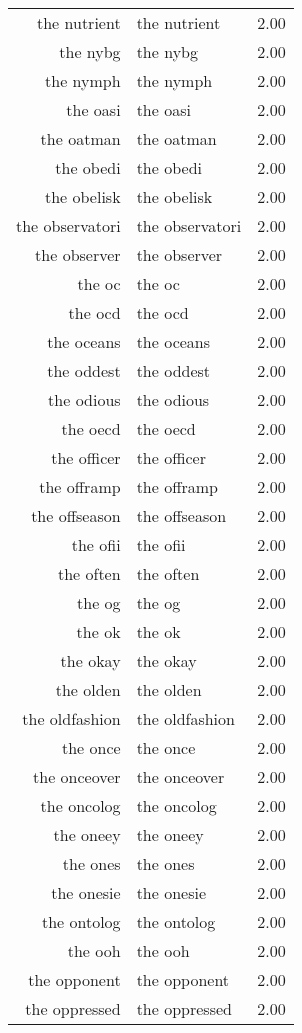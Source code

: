 \begin{table}[ht]
\begin{tabular}{rlr}
  the nutrient & the nutrient & 2.00 \\ 
  the nybg & the nybg & 2.00 \\ 
  the nymph & the nymph & 2.00 \\ 
  the oasi & the oasi & 2.00 \\ 
  the oatman & the oatman & 2.00 \\ 
  the obedi & the obedi & 2.00 \\ 
  the obelisk & the obelisk & 2.00 \\ 
  the observatori & the observatori & 2.00 \\ 
  the observer & the observer & 2.00 \\ 
  the oc & the oc & 2.00 \\ 
  the ocd & the ocd & 2.00 \\ 
  the oceans & the oceans & 2.00 \\ 
  the oddest & the oddest & 2.00 \\ 
  the odious & the odious & 2.00 \\ 
  the oecd & the oecd & 2.00 \\ 
  the officer & the officer & 2.00 \\ 
  the offramp & the offramp & 2.00 \\ 
  the offseason & the offseason & 2.00 \\ 
  the ofii & the ofii & 2.00 \\ 
  the often & the often & 2.00 \\ 
  the og & the og & 2.00 \\ 
  the ok & the ok & 2.00 \\ 
  the okay & the okay & 2.00 \\ 
  the olden & the olden & 2.00 \\ 
  the oldfashion & the oldfashion & 2.00 \\ 
  the once & the once & 2.00 \\ 
  the onceover & the onceover & 2.00 \\ 
  the oncolog & the oncolog & 2.00 \\ 
  the oneey & the oneey & 2.00 \\ 
  the ones & the ones & 2.00 \\ 
  the onesie & the onesie & 2.00 \\ 
  the ontolog & the ontolog & 2.00 \\ 
  the ooh & the ooh & 2.00 \\ 
  the opponent & the opponent & 2.00 \\ 
  the oppressed & the oppressed & 2.00 \\ 

\end{tabular}
\end{table}
